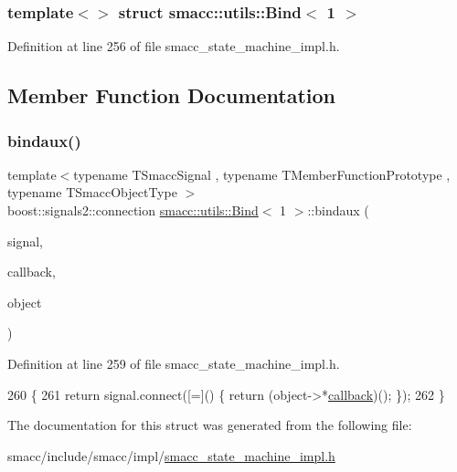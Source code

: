\subsubsection*{template$<$$>$\newline
struct smacc\+::utils\+::\+Bind$<$ 1 $>$}



Definition at line 256 of file smacc\+\_\+state\+\_\+machine\+\_\+impl.\+h.



\subsection{Member Function Documentation}
\mbox{\label{structsmacc_1_1utils_1_1Bind_3_011_01_4_a5704d3cff0b914fc899ff385ff8f8bc2}} 
\subsubsection{\texorpdfstring{bindaux()}{bindaux()}}
{\footnotesize\ttfamily template$<$typename T\+Smacc\+Signal , typename T\+Member\+Function\+Prototype , typename T\+Smacc\+Object\+Type $>$ \\
boost\+::signals2\+::connection \hyperlink{structsmacc_1_1utils_1_1Bind}{smacc\+::utils\+::\+Bind}$<$ 1 $>$\+::bindaux (\begin{DoxyParamCaption}\item[{T\+Smacc\+Signal \&}]{signal,  }\item[{T\+Member\+Function\+Prototype}]{callback,  }\item[{T\+Smacc\+Object\+Type $\ast$}]{object }\end{DoxyParamCaption})\hspace{0.3cm}{\ttfamily [inline]}}



Definition at line 259 of file smacc\+\_\+state\+\_\+machine\+\_\+impl.\+h.


\begin{DoxyCode}
260       \{
261         \textcolor{keywordflow}{return} signal.connect([=]() \{ \textcolor{keywordflow}{return} (object->*\hyperlink{sm__ridgeback__barrel__search__1_2servers_2opencv__perception__node_2opencv__perception__node_8cpp_a050e697bd654facce10ea3f6549669b3}{callback})(); \});
262       \}
\end{DoxyCode}


The documentation for this struct was generated from the following file\+:\begin{DoxyCompactItemize}
\item 
smacc/include/smacc/impl/\hyperlink{smacc__state__machine__impl_8h}{smacc\+\_\+state\+\_\+machine\+\_\+impl.\+h}\end{DoxyCompactItemize}
